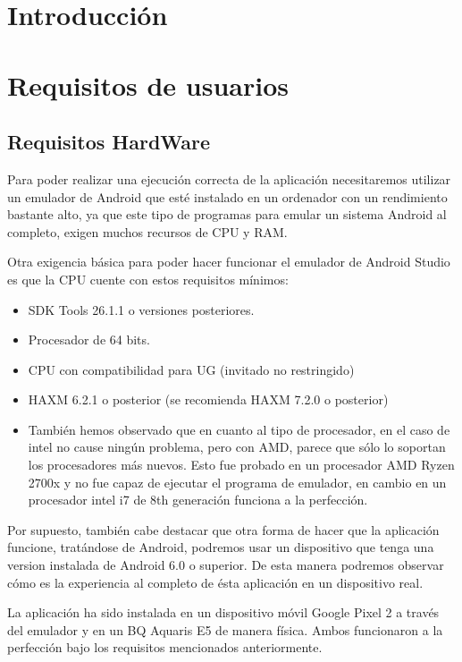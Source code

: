 
\section{Introducción}

\section{Requisitos de usuarios}

\subsection{Requisitos HardWare}

Para poder realizar una ejecución correcta de la aplicación necesitaremos utilizar un emulador de Android que esté instalado en un ordenador con un rendimiento bastante alto, ya que este tipo de programas para emular un sistema Android al completo, exigen muchos recursos de CPU y RAM.

Otra exigencia básica para poder hacer funcionar el emulador de Android Studio es que la CPU cuente con estos requisitos mínimos:

\begin{itemize}
\item SDK Tools 26.1.1 o versiones posteriores.
\item Procesador de 64 bits.
\item CPU con compatibilidad para UG (invitado no restringido)
\item HAXM 6.2.1 o posterior (se recomienda HAXM 7.2.0 o posterior)
\item También hemos observado que en cuanto al tipo de procesador, en el caso de intel no cause ningún problema, pero con AMD, parece que sólo lo soportan los procesadores más nuevos. Esto fue probado en un procesador AMD Ryzen 2700x y no fue capaz de ejecutar el programa de emulador, en cambio en un procesador intel i7 de 8th generación funciona a la perfección.
\end{itemize}

Por supuesto, también cabe destacar que otra forma de hacer que la aplicación funcione, tratándose de Android, podremos usar un dispositivo que tenga una version instalada de Android 6.0 o superior. De esta manera podremos observar cómo es la experiencia al completo de ésta aplicación en un dispositivo real. 

La aplicación ha sido instalada en un dispositivo móvil Google Pixel 2 a través del emulador y en un BQ Aquaris E5 de manera física. Ambos funcionaron a la perfección bajo los requisitos mencionados anteriormente.  

